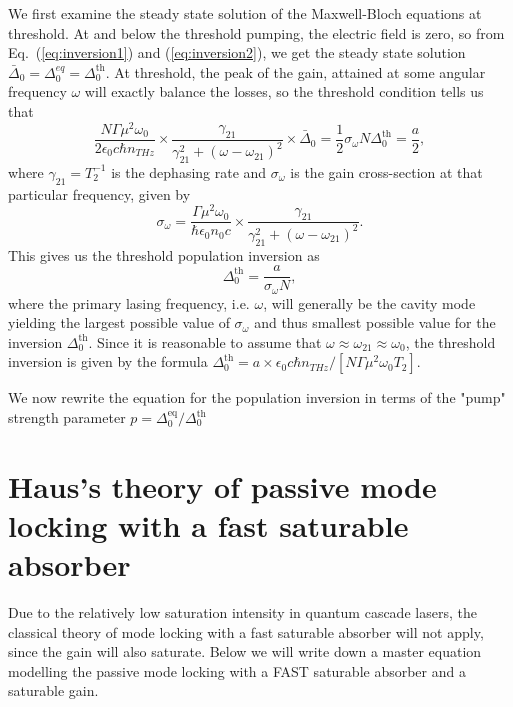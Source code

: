 \documentclass[preprint,secnumarabic,amssymb, nobibnotes, aip, prd]{revtex4-1}
\begin{document}
We first examine the steady state solution of the Maxwell-Bloch equations at threshold. At and below the threshold pumping, the electric field is zero, so from Eq.~(\ref{eq:inversion1}) and (\ref{eq:inversion2}), we get the steady state solution $\bar{\Delta}_0 = \Delta_{0}^{eq} = \Delta_0^{\text{th}}$. At threshold, the peak of the gain, attained at some angular frequency $\omega$ will exactly balance the losses, so the threshold condition tells us that
\begin{equation}
\label{eq:gain-loss-threshold}
\frac{N\Gamma\mu^2\omega_0}{2 \epsilon_0 c \hbar n_{THz}}\times\frac{\gamma_{21}}{\gamma_{21}^2+(\omega-\omega_{21})^2}\times\bar{\Delta}_0 =\frac{1}{2}\sigma_\omega N \Delta_0^{\text{th}} = \frac{a}{2},
\end{equation}
where $\gamma_{21} = T_2^{-1}$ is the dephasing rate and $\sigma_\omega$ is the gain cross-section at that particular frequency, given by
\begin{equation}
\label{eq:cross-section}
\sigma_\omega = \frac{\Gamma \mu^2\omega_{0}}{\hbar\epsilon_0n_0c}\times\frac{\gamma_{21}}{\gamma_{21}^2+(\omega-\omega_{21})^2}.
\end{equation}
This gives us the threshold population inversion as 
\begin{equation}
\label{eq:threshold-inversion}
\Delta_0^{\text{th}} = \frac{a}{\sigma_{\omega}N}, 
\end{equation}
where the primary lasing frequency, i.e. $\omega$, will generally be the cavity mode yielding the largest possible value of $\sigma_\omega$ and thus smallest possible value for the inversion $\Delta_{0}^{\text{th}}$. Since it is reasonable to assume that $\omega \approx \omega_{21}\approx\omega_0$, the threshold inversion is given by the formula $\Delta_0^{\text{th}} = a \times \epsilon_0 c \hbar n_{THz}/\left [N\Gamma\mu^2\omega_0 T_2\right ]$.

We now rewrite the equation for the population inversion in terms of the "pump" strength parameter $p=\Delta_0^{\text{eq}}/\Delta_0^{\text{th}}$

\section{Haus's theory of passive mode locking with a fast saturable absorber}
\label{sec:haustheory}

Due to the relatively low saturation intensity in quantum cascade lasers, the classical theory of mode locking with a fast saturable absorber will not apply, since the gain will also saturate. Below we will write down a master equation modelling the passive mode locking  with a FAST saturable absorber and a saturable gain. 
\end{document}
